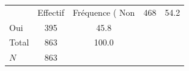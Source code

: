 {
\def\sym#1{\ifmmode^{#1}\else\(^{#1}\)\fi}
\begin{tabular}{l*{1}{cc}}
\toprule
            &    Effectif&Fréquence (%
\midrule
Non         &         468&        54.2\\
Oui         &         395&        45.8\\
Total       &         863&       100.0\\
\midrule
\(N\)       &         863&            \\
\bottomrule
\end{tabular}
}
